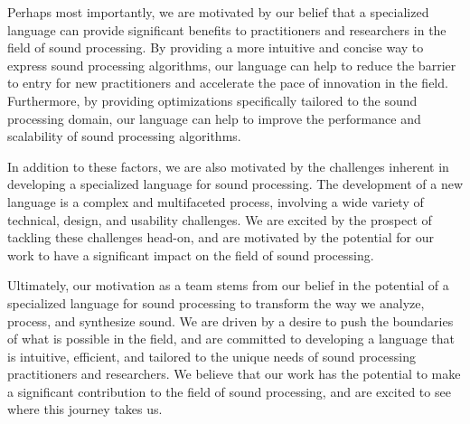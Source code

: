 Perhaps most importantly, we are motivated by our belief that a specialized language can provide significant benefits to practitioners and researchers in the field of sound processing. By providing a more intuitive and concise way to express sound processing algorithms, our language can help to reduce the barrier to entry for new practitioners and accelerate the pace of innovation in the field. Furthermore, by providing optimizations specifically tailored to the sound processing domain, our language can help to improve the performance and scalability of sound processing algorithms.

In addition to these factors, we are also motivated by the challenges inherent in developing a specialized language for sound processing. The development of a new language is a complex and multifaceted process, involving a wide variety of technical, design, and usability challenges. We are excited by the prospect of tackling these challenges head-on, and are motivated by the potential for our work to have a significant impact on the field of sound processing.

Ultimately, our motivation as a team stems from our belief in the potential of a specialized language for sound processing to transform the way we analyze, process, and synthesize sound. We are driven by a desire to push the boundaries of what is possible in the field, and are committed to developing a language that is intuitive, efficient, and tailored to the unique needs of sound processing practitioners and researchers. We believe that our work has the potential to make a significant contribution to the field of sound processing, and are excited to see where this journey takes us.